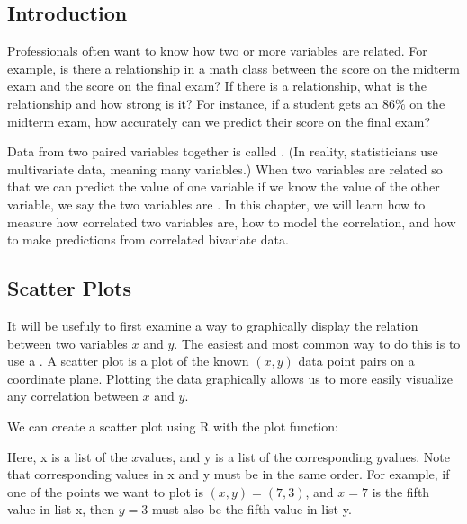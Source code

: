 \documentclass[letterpaper,10pt,english]{jupyterBook}
\begin{document}
\subsection{Introduction}
\label{\detokenize{Ch8 Correlation and Linear Regression/8.1 Scatter Plots:introduction}}
\sphinxAtStartPar
Professionals often want to know how two or more variables are related. For example, is there a relationship in a math class between the score on the midterm exam and the score on the final exam? If there is a relationship, what is the relationship and how strong is it? For instance, if a student gets an \(86\%\) on the midterm exam, how accurately can we predict their score on the final exam?

\sphinxAtStartPar
Data from two paired variables together is called . (In reality, statisticians use multivariate data, meaning many variables.) When two variables are related so that we can predict the value of one variable if we know the value of the other variable, we say the two variables are . In this chapter, we will learn how to measure how correlated two variables are, how to model the correlation, and how to make predictions from correlated bivariate data.


\subsection{Scatter Plots}
\label{\detokenize{Ch8 Correlation and Linear Regression/8.1 Scatter Plots:id1}}
\sphinxAtStartPar
It will be usefuly to first examine a way to graphically display the relation between two variables \(x\) and \(y\). The easiest and most common way to do this is to use a . A scatter plot is a plot of the known \((x, y)\) data point pairs on a coordinate plane. Plotting the data graphically allows us to more easily visualize any correlation between \(x\) and \(y\).

\sphinxAtStartPar
We can create a scatter plot using R with the plot function:

\begin{sphinxVerbatim}[commandchars=\\\{\}]
\end{sphinxVerbatim}

\sphinxAtStartPar
Here, x is a list of the \(x\)\sphinxhyphen{}values, and y is a list of the corresponding \(y\)\sphinxhyphen{}values. Note that corresponding values in x and y must be in the same order. For example, if one of the points we want to plot is \((x, y) = (7, 3)\), and \(x = 7\) is the fifth value in list x, then \(y = 3\) must also be the fifth value in list y.
\end{document}
